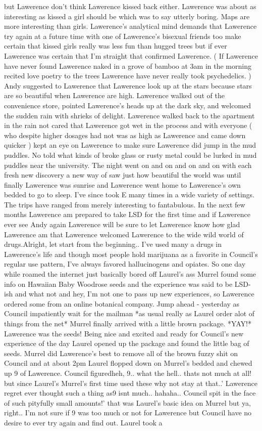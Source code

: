 \documentclass[12pt]{book}
\begin{document}
but Lawerence don't think Lawerence kissed back either. Lawerence was about as interesting as kissed a girl should be which was to say utterly boring. Maps are more interesting than girls. Lawerence's analytical mind demands that Lawerence try again at a future time with one of Lawerence's bisexual friends too make certain that kissed girls really was less fun than hugged trees but if ever Lawerence was certain that I'm straight that confirmed Lawerence. ( If Lawerence have never found Lawerence naked in a grove of bamboo at 3am in the morning recited love poetry to the trees Lawerence have never really took psychedelics. ) Andy suggested to Lawerence that Lawerence look up at the stars because stars are so beautiful when Lawerence are high. Lawerence walked out of the convenience store, pointed Lawerence's heads up at the dark sky, and welcomed the sudden rain with shrieks of delight. Lawerence walked back to the apartment in the rain not cared that Lawerence got wet in the process and with everyone ( who despite higher dosages had not was as high as Lawerence and came down quicker ) kept an eye on Lawerence to make sure Lawerence did jump in the mud puddles. No told what kinds of broke glass or rusty metal could be lurked in mud puddles near the university. The night went on and on and on and on with each fresh new discovery a new way of saw just how beautiful the world was until finally Lawerence was sunrise and Lawerence went home to Lawerence's own bedded to go to sleep. I've since took E many times in a wide variety of settings. The trips have ranged from merely interesting to fantabulous. In the next few months Lawerence am prepared to take LSD for the first time and if Lawerence ever see Andy again Lawerence will be sure to let Lawerence know how glad Lawerence am that Lawerence welcomed Lawerence to the wide wild world of drugs.Alright, let start from the beginning.. I've used many a drugs in Lawerence's life and though most people hold marijuana as a favorite in Council's regular use pattern, I've always favored hallucinogens and opiates. So one day while roamed the internet just basically bored off Laurel's ass Murrel found some info on Hawaiian Baby Woodrose seeds and the experience was said to be LSD-ish and what not and hey, I'm not one to pass up new experiences, so Lawerence ordered some from an online botanical company. Jump ahead - yesterday as Council impatiently wait for the mailman *as usual really as Laurel order alot of things from the net* Murrel finally arrived with a little brown package. *YAY!* Lawerence was the seeds! Being nice and excited and ready for Council's new experience of the day Laurel opened up the package and found the little bag of seeds. Murrel did Lawerence's best to remove all of the brown fuzzy shit on Council and at about 2pm Laurel flopped down on Murrel's bedded and chewed up 9 of Lawerence. Council figuredheh, 9.. what the hell.. thats not much at all! but since Laurel's Murrel's first time used these why not stay at that..' Lawerence regret ever thought such a thing as9 isnt much.. hahaha.. Council spit in the face of such pityfully small amounts!' that was Laurel's basic idea on Murrel but ya, right.. I'm not sure if 9 was too much or not for Lawerence but Council have no desire to ever try again and find out. Laurel took a 
\end{document}
